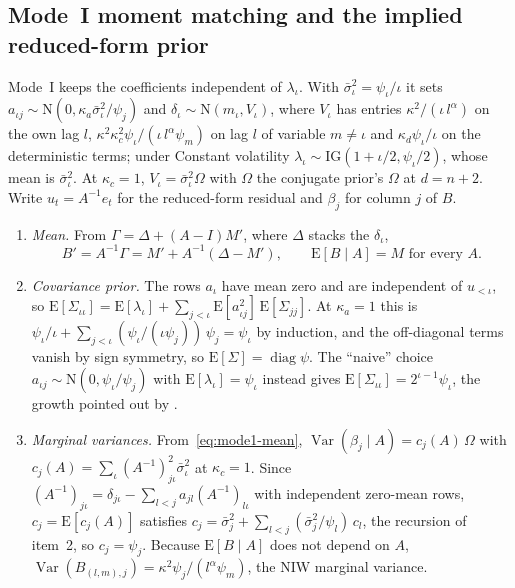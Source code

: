 \subsection{Mode~I moment matching and the implied reduced-form prior}\label{app:mode1}

Mode~I keeps the coefficients independent of $\lambda_\iota$.
With $\bar\sigma_\iota^2 = \psi_\iota/\iota$ it sets
$a_{\iota j} \sim \mathrm{N}(0, \kappa_a \bar\sigma_\iota^2/\psi_j)$ and $\delta_\iota \sim
\mathrm{N}(m_\iota, V_\iota)$, where $V_\iota$ has entries $\kappa^2/(\iota\, l^\alpha)$ on the own
lag $l$, $\kappa^2\kappa_c^2 \psi_\iota/(\iota\, l^\alpha \psi_m)$ on lag $l$ of variable $m \ne
\iota$ and $\kappa_d\psi_\iota/\iota$ on the deterministic terms; under Constant volatility
$\lambda_\iota \sim \mathrm{IG}(1 + \iota/2, \psi_\iota/2)$, whose mean is $\bar\sigma^2_\iota$.
At $\kappa_c = 1$, $V_\iota = \bar\sigma_\iota^2\Omega$ with $\Omega$ the conjugate prior's
$\Omega$ at $d = n + 2$.
Write $u_t = A^{-1}e_t$ for the reduced-form residual and $\beta_j$ for column $j$ of $B$.

\begin{enumerate}
\item \emph{Mean.} From $\Gamma = \Delta + (A - I)M'$, where $\Delta$ stacks the $\delta_\iota$,
\begin{equation}\label{eq:mode1-mean}
B' = A^{-1}\Gamma = M' + A^{-1}(\Delta - M'), \qquad \mathrm{E}[B \mid A] = M \text{ for every } A.
\end{equation}
\item \emph{Covariance prior.} The rows $a_\iota$ have mean zero and are independent of
$u_{<\iota}$, so $\mathrm{E}[\Sigma_{\iota\iota}] = \mathrm{E}[\lambda_\iota] + \sum_{j<\iota}
\mathrm{E}[a_{\iota j}^2]\,\mathrm{E}[\Sigma_{jj}]$.
At $\kappa_a = 1$ this is $\psi_\iota/\iota + \sum_{j<\iota} (\psi_\iota/(\iota\psi_j))\,\psi_j =
\psi_\iota$ by induction, and the off-diagonal terms vanish by sign symmetry, so $\mathrm{E}[\Sigma] =
\operatorname{diag}\psi$.
The ``naive'' choice $a_{\iota j} \sim \mathrm{N}(0, \psi_\iota/\psi_j)$ with $\mathrm{E}[\lambda_\iota]
= \psi_\iota$ instead gives $\mathrm{E}[\Sigma_{\iota\iota}] = 2^{\iota-1}\psi_\iota$, the growth
pointed out by \citet{chan2024large}.
\item \emph{Marginal variances.} From~\eqref{eq:mode1-mean}, $\operatorname{Var}(\beta_j \mid A) =
c_j(A)\,\Omega$ with $c_j(A) = \sum_\iota (A^{-1})_{j\iota}^2 \bar\sigma_\iota^2$ at $\kappa_c = 1$.
Since $(A^{-1})_{j\iota} = \delta_{j\iota} - \sum_{l<j} a_{jl}(A^{-1})_{l\iota}$ with independent
zero-mean rows, $c_j = \mathrm{E}[c_j(A)]$ satisfies $c_j = \bar\sigma_j^2 + \sum_{l<j}
(\bar\sigma_j^2/\psi_l)\, c_l$, the recursion of item~2, so $c_j = \psi_j$.
Because $\mathrm{E}[B \mid A]$ does not depend on $A$, $\operatorname{Var}(B_{(l,m),j}) =
\kappa^2\psi_j/(l^\alpha\psi_m)$, the NIW marginal variance.
\end{enumerate}

